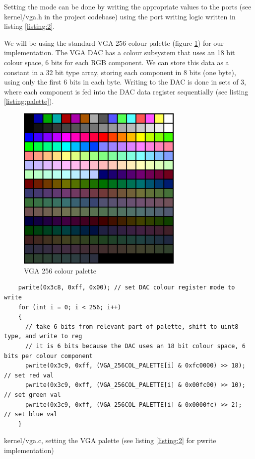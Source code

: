 Setting the mode can be done by writing the appropriate values to the ports (see kernel/vga.h in the project codebase)
using the port writing logic written in listing \ref{listing:2}.

We will be using the standard VGA 256 colour palette (figure \ref{figure:vgacolor}) for
our implementation. The VGA DAC has a colour subsystem that uses an 18 bit colour
space, 6 bits for each RGB component. We can store this data as a constant in a 32 bit
type array, storing each component in 8 bits (one byte), using only the first 6 bits in each byte.
Writing to the DAC is done in sets of 3, where each component is fed into the DAC data register
sequentially (see listing \ref{listing:palette}).

\begin{figure}[H]
    \centering
    \includegraphics[width=8cm]{1024px-VGA_palette_with_black_borders.png}
    \caption{VGA 256 colour palette}
    \label{figure:vgacolor}
\end{figure}
\begin{listing}[H]
    \begin{verbatim}
    pwrite(0x3c8, 0xff, 0x00); // set DAC colour register mode to write
    for (int i = 0; i < 256; i++)
    {
      // take 6 bits from relevant part of palette, shift to uint8 type, and write to reg
      // it is 6 bits because the DAC uses an 18 bit colour space, 6 bits per colour component
      pwrite(0x3c9, 0xff, (VGA_256COL_PALETTE[i] & 0xfc0000) >> 18); // set red val
      pwrite(0x3c9, 0xff, (VGA_256COL_PALETTE[i] & 0x00fc00) >> 10); // set green val
      pwrite(0x3c9, 0xff, (VGA_256COL_PALETTE[i] & 0x0000fc) >> 2);  // set blue val
    }
    \end{verbatim}
    \caption{kernel/vga.c, setting the VGA palette (see listing \ref{listing:2} for pwrite implementation)}
    \label{listing:palette}
\end{listing}

